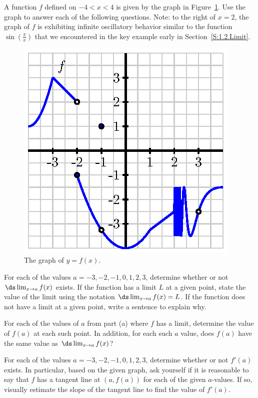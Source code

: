 \begin{pa} \label{PA:1.7}
A function $f$ defined on $-4 < x < 4$ is given by the graph in Figure~\ref{F:1.7.PA1}.  Use the graph to answer each of the following questions.  Note: to the right of $x = 2$, the graph of $f$ is exhibiting infinite oscillatory behavior similar to the function $\sin(\frac{\pi}{x})$ that we encountered in the key example early in Section~\ref{S:1.2.Limit}.
\begin{figure}[h]
\begin{center}
\includegraphics{figures/1_7_PA1.eps}
\caption{The graph of $y = f(x)$.} \label{F:1.7.PA1}
\end{center}
\end{figure}
\ba
	\item For each of the values $a = -3, -2, -1, 0, 1, 2, 3$, determine whether or not $\ds \lim_{x \to a} f(x)$ exists.  If the function has a limit $L$ at a given point, state the value of the limit using the notation $\ds \lim_{x \to a} f(x) = L$.  If the function does not have a limit at a given point, write a sentence to explain why.
	\item For each of the values of $a$ from part (a) where $f$ has a limit, determine the value of $f(a)$ at each such point.  In addition, for each such $a$ value, does $f(a)$ have the same value as $\ds \lim_{x \to a} f(x)$?
	\item For each of the values $a = -3, -2, -1, 0, 1, 2, 3$, determine whether or not $f'(a)$ exists.  In particular, based on the given graph, ask yourself if it is reasonable to say that $f$ has a tangent line at $(a,f(a))$ for each of the given $a$-values.  If so, visually estimate the slope of the tangent line to find the value of $f'(a)$.
\ea
\end{pa} 

\afterpa

